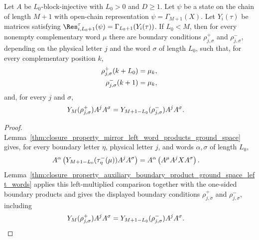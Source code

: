 \begin{lemma}
    \label{thm:closure_property_auxiliary_boundary_product_chain_ground_space}
    \leanok
    Let $A$ be $L_0$-block-injective with $L_0>0$ and $D\ge1$. Let $\psi$ be a
    state on the chain of length $M+1$ with open-chain representation
    $\psi=\Gamma_{M+1}(X)$. Let $Y_i(\tau)$ be matrices satisfying
    $\Res^{\tau}_{i,L_0+1}(\psi) = \Gamma_{L_0+1}(Y_i(\tau))$.
    If $L_0<M$, then for every nonempty complementary word $\mu$ there are
    boundary conditions $\rho^+_{j,\sigma}$ and $\rho^-_{j,\sigma}$, depending
    on the physical letter $j$ and the word $\sigma$ of length $L_0$, such that,
    for every complementary position $k$,
    \begin{align}
        \rho^+_{j,\sigma}(k+L_0)
         & =
        \mu_k,
        \notag \\
        \rho^-_{j,\sigma}(k+1)
         & =
        \mu_k,
        \notag
    \end{align}
    and, for every $j$ and $\sigma$,
    \begin{align}
        Y_M(\rho^+_{j,\sigma})A^jA^\sigma
         & =
        Y_{M+1-L_0}(\rho^-_{j,\sigma})A^jA^\sigma.
        \notag
    \end{align}
\end{lemma}

\begin{proof}
    \leanok
    Lemma~\ref{thm:closure_property_mirror_left_word_products_ground_space}
    gives, for every boundary letter $\eta$, physical letter $j$, and words
    $\alpha,\sigma$ of length $L_0$,
    \begin{align}
        A^\alpha
        \left(Y_{M+1-L_0}(\tau^-_\eta(\mu))A^jA^\sigma\right)
         & =
        A^\alpha
        \left(A^\mu A^jXA^\sigma\right).
        \notag
    \end{align}
    Lemma~\ref{thm:closure_property_auxiliary_boundary_product_ground_space_left_words}
    applies this left-multiplied comparison together with the one-sided
    boundary products and gives the displayed boundary conditions
    $\rho^+_{j,\sigma}$ and $\rho^-_{j,\sigma}$, including
    \begin{align}
        Y_M(\rho^+_{j,\sigma})A^jA^\sigma
         & =
        Y_{M+1-L_0}(\rho^-_{j,\sigma})A^jA^\sigma.
        \notag
    \end{align}
\end{proof}

